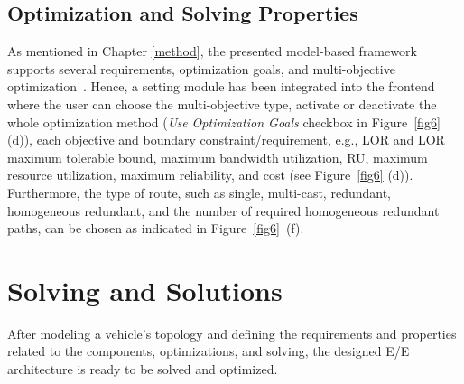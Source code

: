     \subsection{Optimization and Solving Properties}

 
    As mentioned in Chapter \ref{method}, the presented model-based framework supports several requirements, optimization goals, and multi-objective optimization~\cite{askaripoor2023designer, 9565115}. Hence, a setting module has been integrated into the frontend where the user can choose the multi-objective type, activate or deactivate the whole optimization method (\textit{Use Optimization Goals} checkbox in Figure~\ref{fig6} (d)), each objective and boundary constraint/requirement, e.g., LOR and LOR maximum tolerable bound, maximum bandwidth utilization, RU, maximum resource utilization, maximum reliability, and cost (see Figure~\ref{fig6} (d)). Furthermore, the type of route, such as single, multi-cast, redundant, homogeneous redundant, and the number of required homogeneous redundant paths, can be chosen as indicated in Figure~\ref{fig6}~(f). 
    
 
    \section{Solving and Solutions}
    
    After modeling a vehicle's topology and defining the requirements and properties related to the components, optimizations, and solving, the designed E/E architecture is ready to be solved and optimized. 
    
    
    
